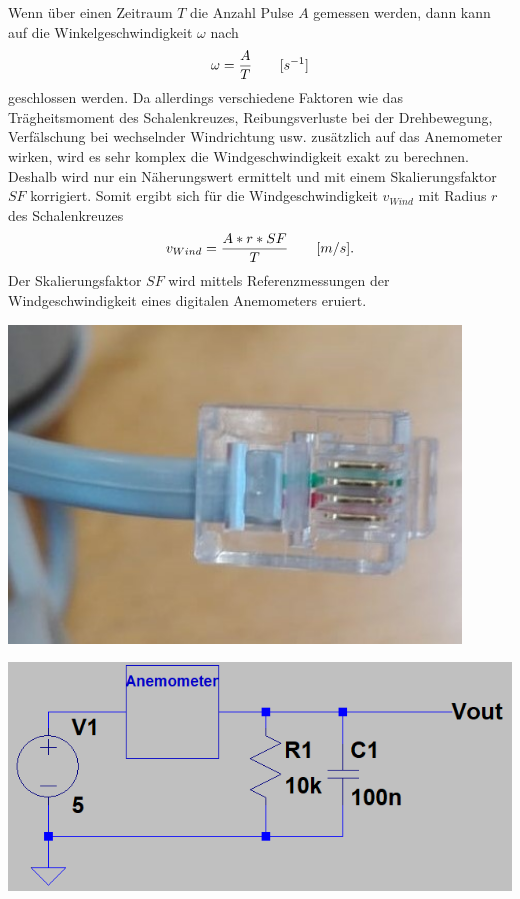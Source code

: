 \begin{minipage}{0.55\textwidth}
Wenn über einen Zeitraum $T$ die Anzahl Pulse $A$ gemessen werden, dann kann auf die Winkelgeschwindigkeit $\omega$ nach 
\begin{equation}
\centering
\omega=\frac{A}{T}\qquad[s^{-1}]
\end{equation}
geschlossen werden. Da allerdings verschiedene Faktoren wie das Trägheitsmoment des Schalenkreuzes, Reibungsverluste bei der Drehbewegung, Verfälschung bei wechselnder Windrichtung usw. zusätzlich auf das Anemometer wirken, wird es sehr komplex die Windgeschwindigkeit exakt zu berechnen. Deshalb wird nur ein Näherungswert ermittelt und mit einem Skalierungsfaktor $SF$ korrigiert. Somit ergibt sich für die Windgeschwindigkeit $v_{Wind}$ mit Radius $r$ des Schalenkreuzes
\begin{equation}
\centering
v_{Wind} = \frac{A*r*SF}{T}\qquad[m/s].
\label{equ:berechnungWindgeschwindigkeit}
\end{equation}
Der Skalierungsfaktor $SF$ wird mittels Referenzmessungen der Windgeschwindigkeit eines digitalen Anemometers eruiert. 
\end{minipage}
\begin{minipage}{0.44\textwidth}
\vspace{0.5cm}
\centering
\includegraphics[width=0.9\textwidth]{graphics/Anemometer/rj_11_anschlussstecker.png}
\label{fig:rj11stecker}
\vspace{0.5cm}
\end{minipage}
\begin{minipage}{0.55\textwidth}
\vspace{0.55cm}
\centering
\includegraphics[width=\textwidth]{graphics/Anemometer/schaltung_anemometer.png}
\label{fig:beschaltungAnemometer}
\end{minipage}
